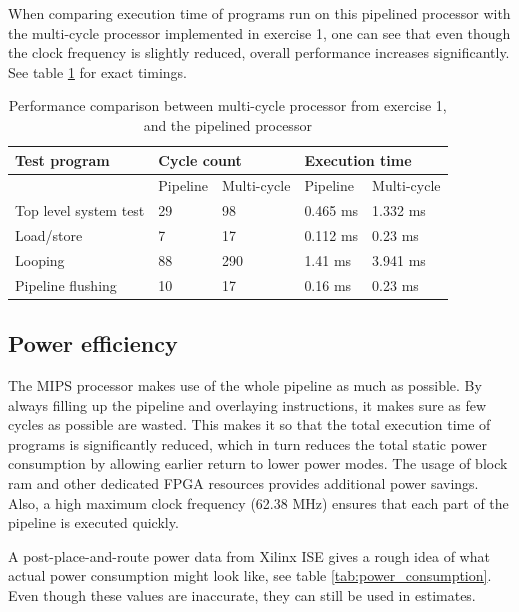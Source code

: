 When comparing execution time of programs run on this pipelined processor with the multi-cycle processor implemented in exercise 1, one can see that even though the clock frequency is slightly reduced, overall performance increases significantly.
See table \ref{table:execution_time} for exact timings.

\begin{table}[H]
    \begin{center}
    \begin{tabular}{|l|l|l|l|l|}
    \hline
    Test program          & \multicolumn{2}{l|}{Cycle count} & \multicolumn{2}{l|}{Execution time} \\ \hline
    ~                     & Pipeline    & Multi-cycle & Pipeline       & Multi-cycle \\ \hline
    Top level system test & 29          & 98          & 0.465 ms       & 1.332 ms    \\ \hline
    Load/store            & 7           & 17          & 0.112 ms       & 0.23 ms     \\ \hline
    Looping               & 88          & 290         & 1.41 ms        & 3.941 ms    \\ \hline
    Pipeline flushing     & 10          & 17          & 0.16 ms        & 0.23 ms     \\ \hline
    \end{tabular}
    \end{center}
    \caption{Performance comparison between multi-cycle processor from exercise 1, and the pipelined processor}
    \label{table:execution_time}
\end{table}

\subsection{Power efficiency}

The MIPS processor makes use of the whole pipeline as much as possible.
By always filling up the pipeline and overlaying instructions, it makes sure as few cycles as possible are wasted.
This makes it so that the total execution time of programs is significantly reduced, which in turn reduces the total static power consumption by allowing earlier return to lower power modes.
The usage of block ram and other dedicated FPGA resources provides additional power savings.
Also, a high maximum clock frequency (62.38 MHz) ensures that each part of the pipeline is executed quickly.

A post-place-and-route power data from Xilinx ISE gives a rough idea of what actual power consumption might look like, see table \ref{tab:power_consumption}.
Even though these values are inaccurate, they can still be used in estimates.

